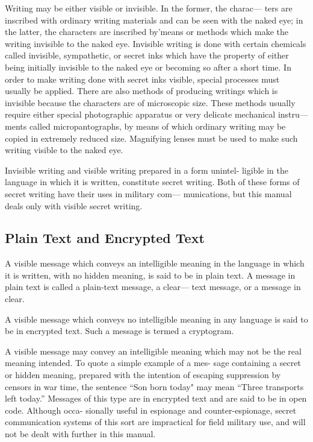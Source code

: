 \mypara Writing may be either visible or invisible. In the former, the charac—
ters are inscribed with ordinary writing materials and can be seen with
the naked eye; in the latter, the characters are inscribed by'means or
methods which make the writing invisible to the naked eye. Invisible
writing is done with certain chemicals called invisible, sympathetic, or
secret inks which have the property of either being initially invisible to
the naked eye or becoming so after a short time. In order to make writing
done with secret inks visible, special processes must usually be applied.
There are also methods of producing writings which is invisible because
the characters are of microscopic size. These methods usually require
either special photographic apparatus or very delicate mechanical instru—
ments called micropantographs, by means of which ordinary writing may
be copied in extremely reduced size. Magnifying lenses must be used to
make such writing visible to the naked eye.

\mypara Invisible writing and visible writing prepared in a form unintel-
ligible in the language in which it is written, constitute secret writing.
Both of these forms of secret writing have their uses in military com—
munications, but this manual deals only with visible secret writing.

\subsection{Plain Text and Encrypted Text}

\mypara A visible message which conveys an intelligible meaning in the
language in which it is written, with no hidden meaning, is said to be in
plain text. A message in plain text is called a plain-text message, a clear—
text message, or a message in clear.

\mypara A visible message which conveys no intelligible meaning in any
language is said to be in encrypted text. Such a message is termed a
cryptogram.

\mypara A visible message may convey an intelligible meaning which may
not be the real meaning intended. To quote a simple example of a mes-
sage containing a secret or hidden meaning, prepared with the intention
of escaping suppression by censors in war time, the sentence “Son born
today" may mean “Three transports left today.” Messages of this type
are in encrypted text and are said to be in open code. Although occa-
sionally useful in espionage and counter-espionage, secret communication
systems of this sort are impractical for ﬁeld military use, and will not
be dealt with further in this manual.

